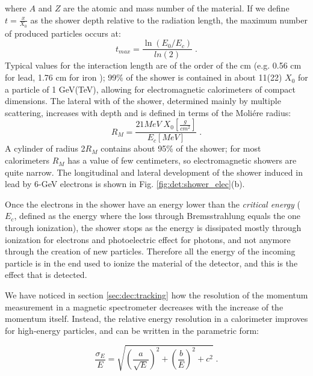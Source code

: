 \noindent where $A$ and $Z$ are the atomic and mass number of the material. If we define $t = \frac{x}{X_0}$ as the shower depth relative to the radiation length, the maximum number of produced particles occurs at:
\begin{equation}
t_{max} = \frac{\ln\left(E_0/E_c\right)}{ln\left(2\right)} \;.
\end{equation}
Typical values for the interaction length are of the order of the cm (e.g. 0.56 cm for lead, 1.76 cm for iron \cite{Patrignani:2016xqp}); 99\% of the shower is contained in about 11(22) $X_0$ for a particle of 1 GeV(TeV), allowing for electromagnetic calorimeters of compact dimensions. 
The lateral with of the shower, determined mainly by multiple scattering, increases with depth and is defined in terms of the Moli\'ere radius:
\begin{equation}
R_M = \frac{21 MeV \; X_0[\frac{g}{cm^2}]}{E_c [MeV]} \; .
\end{equation}
A cylinder of radius 2$R_M$ contains about 95\% of the shower; for most calorimeters $R_M$ has a value of few centimeters, so electromagnetic showers are quite narrow. The longitudinal and lateral development of the shower induced in lead by 6-GeV electrons is shown in Fig. \ref{fig:det:shower_elec}(b).

Once the electrons in the shower have an energy lower than the \textit{critical energy} ($E_c$, defined as the energy where the loss through Bremsstrahlung equals the one through ionization), the shower stops as the energy is dissipated mostly through ionization for electrons and photoelectric effect for photons, and not anymore through the creation of new particles. Therefore all the energy of the incoming particle is in the end used to ionize the material of the detector, and this is the effect that is detected.


We have noticed in section \ref{sec:dec:tracking} how the resolution of the momentum measurement in a magnetic spectrometer decreases with the increase of the momentum itself. Instead, the relative energy resolution in a calorimeter improves for high-energy particles, and can be written in the parametric form:

\begin{equation}
\frac{\sigma_E}{E} = \sqrt{\left(\frac{a}{\sqrt{E}} \right)^2 + \left( \frac{b}{E} \right)^2 + c^2 } \; .
\end{equation}

